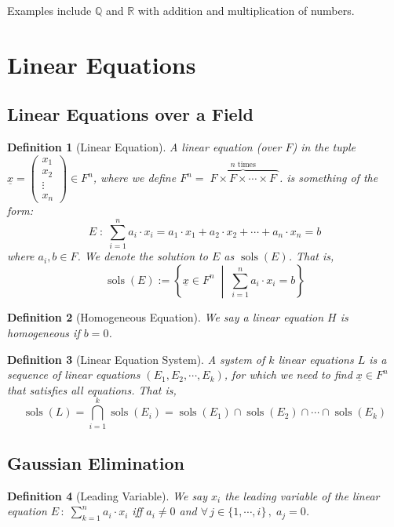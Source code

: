 \documentclass[12pt]{article}
\newcommand{\set}[2]{\left\{{#1}\;\middle|\;{#2}\right\}}
\newcommand{\Forall}[1]{\forall\,{#1}\,,\;}
\newcommand{\tuple}[1]{\underline{#1}}
\DeclareMathOperator{\sols}{sols}
\newtheorem{definition}{Definition}[subsection]
\begin{document}
Examples include $\mathbb{Q}$ and $\mathbb{R}$ with addition and multiplication of numbers.

\pagebreak

\section{Linear Equations}

\subsection{Linear Equations over a Field}

\begin{definition}[Linear Equation]
  A linear equation (over $F$) in the tuple $\tuple{x}=\begin{pmatrix}x_1\\x_2\\\vdots\\x_n\end{pmatrix}\in F^n$, where we define $F^n=\overbrace{\;F\times F\times \cdots\times F\;}^{n\text{ times}}$. is something of the form: $$ E\;:\;\sum_{i=1}^n a_i\cdot x_i=a_1\cdot x_1+a_2\cdot x_2+\cdots+a_n\cdot x_n=b$$ where $a_i,b\in F$. We denote the solution to $E$ as $\sols(E)$. That is, $$\sols(E):=\set{\tuple{x}\in F^n}{\sum_{i=1}^n a_i\cdot x_i=b}$$
\end{definition}

\begin{definition}[Homogeneous Equation]
  We say a linear equation $H$ is homogeneous if $b=0$. 
\end{definition}

\begin{definition}[Linear Equation System]
  A system of $k$ linear equations $L$ is a sequence of linear equations $(E_1,E_2,\cdots,E_k)$, for which we need to find $\tuple{x}\in F^n$ that satisfies all equations. That is, $$\sols(L)=\bigcap_{i=1}^k \sols(E_i)=\sols(E_1)\cap\sols(E_2)\cap\cdots\cap\sols(E_k)$$
\end{definition}

\subsection{Gaussian Elimination}

\begin{definition}[Leading Variable]
  We say $x_i$ the leading variable of the linear equation $E\,:\;\displaystyle\sum_{k=1}^n a_i\cdot x_i$ iff $a_i\neq 0$ and $\Forall{j\in\{1,\cdots,i\}} a_j=0$.
\end{definition}
\end{document}
